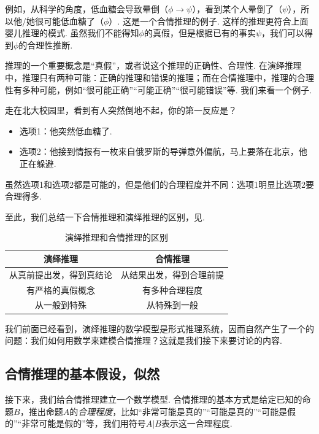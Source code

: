 例如，从科学的角度，低血糖会导致晕倒（$\phi\to \psi$），看到某个人晕倒了（$\psi$），所以他/她很可能低血糖了（$\phi$）. 这是一个合情推理的例子. 这样的推理更符合上面婴儿推理的模式. 虽然我们不能得知$\phi$的真假，但是根据已有的事实$\psi$，我们可以得到$\phi$的合理性推断.

推理的一个重要概念是“真假”，或者说这个推理的正确性、合理性. 在演绎推理中，推理只有两种可能：正确的推理和错误的推理；而在合情推理中，推理的合理性有多种可能，例如“很可能正确”“可能正确”“很可能错误”等. 我们来看一个例子. 

\begin{example}
    走在北大校园里，看到有人突然倒地不起，你的第一反应是？
    \begin{itemize}
        \item 选项1：他突然低血糖了.
        \item 选项2：他接到情报有一枚来自俄罗斯的导弹意外偏航，马上要落在北京，他正在躲避.
    \end{itemize}
\end{example}
虽然选项1和选项2都是可能的，但是他们的合理程度并不同：选项1明显比选项2要合理得多. 

至此，我们总结一下合情推理和演绎推理的区别，见.

\begin{table}[htbp]
    \centering
    \caption{演绎推理和合情推理的区别}
    \label{tab:deductive-vs-plausible}
    \begin{tabular}{c|c}
        \toprule
        演绎推理 & 合情推理 \\\midrule
        从真前提出发，得到真结论 & 从结果出发，得到合理前提 \\
        有严格的真假概念 & 有多种合理程度 \\
        从一般到特殊 & 从特殊到一般 \\
        \bottomrule
    \end{tabular}
\end{table}

我们前面已经看到，演绎推理的数学模型是形式推理系统，因而自然产生了一个的问题：我们如何用数学来建模合情推理？这就是我们接下来要讨论的内容.

\subsection{合情推理的基本假设，似然}

接下来，我们给合情推理建立一个数学模型. 合情推理的基本方式是给定已知的命题$B$，推出命题$A$的\textit{合理程度}，比如“非常可能是真的”“可能是真的”“可能是假的”“非常可能是假的”等，我们用符号$A|B$表示这一合理程度. 

